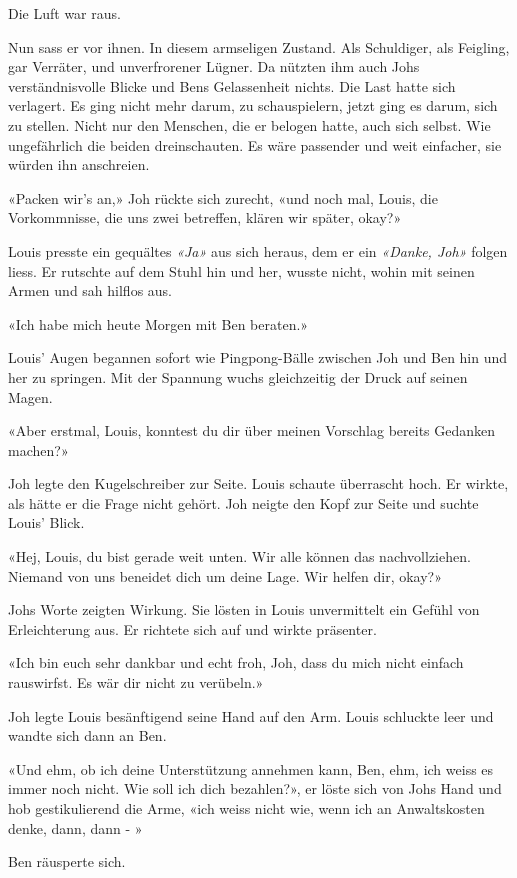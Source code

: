 Die Luft war raus.

Nun sass er vor ihnen. In diesem armseligen Zustand. Als Schuldiger, als
Feigling, gar Verräter, und unverfrorener Lügner. Da nützten ihm auch
Johs verständnisvolle Blicke und Bens Gelassenheit nichts. Die Last
hatte sich verlagert. Es ging nicht mehr darum, zu schauspielern, jetzt
ging es darum, sich zu stellen. Nicht nur den Menschen, die er belogen
hatte, auch sich selbst.
Wie ungefährlich die beiden dreinschauten. Es wäre passender und weit
einfacher, sie würden ihn anschreien.

«Packen wir’s an,» Joh rückte sich zurecht, «und noch mal, Louis, die
Vorkommnisse, die uns zwei betreffen, klären wir später, okay?»

Louis presste ein gequältes \emph{«Ja»} aus sich heraus, dem er ein
\emph{«Danke, Joh»} folgen liess. Er rutschte auf dem Stuhl hin und her,
wusste nicht, wohin mit seinen Armen und sah hilflos aus.

«Ich habe mich heute Morgen mit Ben beraten.»

Louis’ Augen begannen sofort wie Pingpong-Bälle zwischen Joh und Ben hin
und her zu springen. Mit der Spannung wuchs gleichzeitig der Druck auf
seinen Magen. 

«Aber erstmal, Louis, konntest du dir über meinen Vorschlag bereits Gedanken machen?»

Joh legte den Kugelschreiber zur Seite. Louis schaute überrascht hoch. Er wirkte, als hätte er die Frage nicht 
gehört.
Joh neigte den Kopf zur Seite und suchte Louis’ Blick.

«Hej, Louis, du bist gerade weit unten. Wir alle
können das nachvollziehen. Niemand von uns beneidet dich um deine Lage.
Wir helfen dir, okay?»

Johs Worte zeigten Wirkung. Sie lösten in Louis unvermittelt ein Gefühl
von Erleichterung aus. Er richtete sich auf und wirkte 
präsenter.

«Ich bin euch sehr dankbar und echt froh, Joh, dass du mich nicht
einfach rauswirfst. Es wär dir nicht zu verübeln.»

Joh legte Louis besänftigend seine Hand auf den Arm. Louis schluckte leer und wandte sich dann an Ben.

«Und ehm, ob ich deine Unterstützung annehmen kann, Ben, ehm, ich weiss
es immer noch nicht. Wie soll ich dich bezahlen?», er löste sich von
Johs Hand und hob gestikulierend die Arme, «ich weiss nicht wie, wenn
ich an Anwaltskosten denke, dann, dann - »

Ben räusperte sich.

